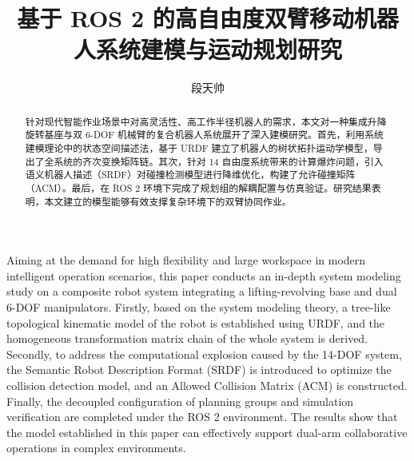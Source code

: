 \documentclass{uestc-article}
\title{基于 ROS 2 的高自由度双臂移动机器人系统建模与运动规划研究}
\author{段天帅}
\begin{document}
\maketitle

\begin{abstract}
针对现代智能作业场景中对高灵活性、高工作半径机器人的需求，本文对一种集成升降旋转基座与双 6-DOF 机械臂的复合机器人系统展开了深入建模研究。首先，利用系统建模理论中的状态空间描述法，基于 URDF 建立了机器人的树状拓扑运动学模型，导出了全系统的齐次变换矩阵链。其次，针对 14 自由度系统带来的计算爆炸问题，引入语义机器人描述（SRDF）对碰撞检测模型进行降维优化，构建了允许碰撞矩阵（ACM）。最后，在 ROS 2 环境下完成了规划组的解耦配置与仿真验证。研究结果表明，本文建立的模型能够有效支撑复杂环境下的双臂协同作业。
\end{abstract}


\maketitlen

\begin{abstracten}
Aiming at the demand for high flexibility and large workspace in modern intelligent operation scenarios, this paper conducts an in-depth system modeling study on a composite robot system integrating a lifting-revolving base and dual 6-DOF manipulators. Firstly, based on the system modeling theory, a tree-like topological kinematic model of the robot is established using URDF, and the homogeneous transformation matrix chain of the whole system is derived. Secondly, to address the computational explosion caused by the 14-DOF system, the Semantic Robot Description Format (SRDF) is introduced to optimize the collision detection model, and an Allowed Collision Matrix (ACM) is constructed. Finally, the decoupled configuration of planning groups and simulation verification are completed under the ROS 2 environment. The results show that the model established in this paper can effectively support dual-arm collaborative operations in complex environments.
\end{abstracten}

\end{document}
